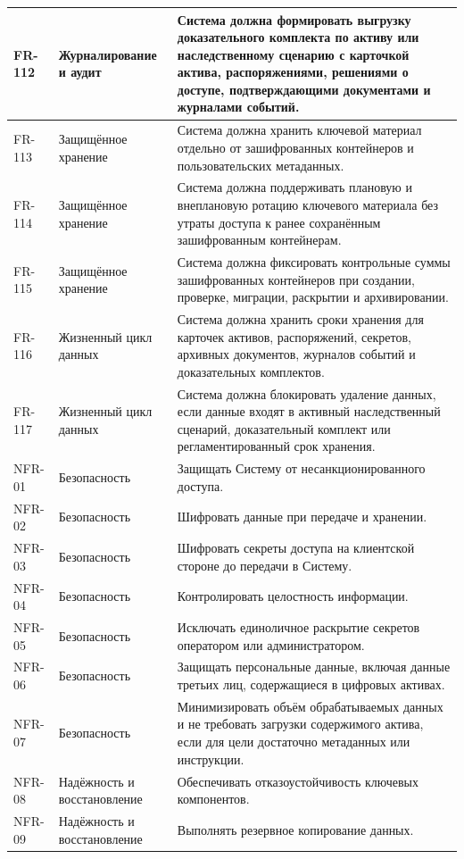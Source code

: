 \begin{longtable}{|P{1.45cm}|P{3.35cm}|P{10.7cm}|}
FR-112 & Журналирование и аудит & Система должна формировать выгрузку доказательного комплекта по активу или наследственному сценарию с карточкой актива, распоряжениями, решениями о доступе, подтверждающими документами и журналами событий.\\ \hline
FR-113 & Защищённое хранение & Система должна хранить ключевой материал отдельно от зашифрованных контейнеров и пользовательских метаданных.\\ \hline
FR-114 & Защищённое хранение & Система должна поддерживать плановую и внеплановую ротацию ключевого материала без утраты доступа к ранее сохранённым зашифрованным контейнерам.\\ \hline
FR-115 & Защищённое хранение & Система должна фиксировать контрольные суммы зашифрованных контейнеров при создании, проверке, миграции, раскрытии и архивировании.\\ \hline
FR-116 & Жизненный цикл данных & Система должна хранить сроки хранения для карточек активов, распоряжений, секретов, архивных документов, журналов событий и доказательных комплектов.\\ \hline
FR-117 & Жизненный цикл данных & Система должна блокировать удаление данных, если данные входят в активный наследственный сценарий, доказательный комплект или регламентированный срок хранения.\\ \hline
NFR-01 & Безопасность & Защищать Систему от несанкционированного доступа.\\ \hline
NFR-02 & Безопасность & Шифровать данные при передаче и хранении.\\ \hline
NFR-03 & Безопасность & Шифровать секреты доступа на клиентской стороне до передачи в Систему.\\ \hline
NFR-04 & Безопасность & Контролировать целостность информации.\\ \hline
NFR-05 & Безопасность & Исключать единоличное раскрытие секретов оператором или администратором.\\ \hline
NFR-06 & Безопасность & Защищать персональные данные, включая данные третьих лиц, содержащиеся в цифровых активах.\\ \hline
NFR-07 & Безопасность & Минимизировать объём обрабатываемых данных и не требовать загрузки содержимого актива, если для цели достаточно метаданных или инструкции.\\ \hline
NFR-08 & Надёжность и восстановление & Обеспечивать отказоустойчивость ключевых компонентов.\\ \hline
NFR-09 & Надёжность и восстановление & Выполнять резервное копирование данных.\\ \hline

\end{longtable}
